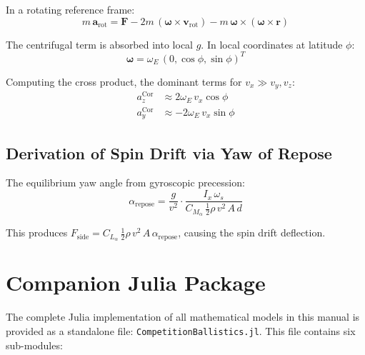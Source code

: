 \documentclass[11pt,twoside,openright]{report}
\newcommand{\vvec}{\bm{v}}
\newcommand{\avec}{\bm{a}}
\newcommand{\rvec}{\bm{r}}
\begin{document}
In a rotating reference frame:
\begin{equation}
  m\,\avec_{\mathrm{rot}} = \bm{F} - 2m\,(\bm{\omega}\times\vvec_{\mathrm{rot}}) - m\,\bm{\omega}\times(\bm{\omega}\times\rvec)
\end{equation}

The centrifugal term is absorbed into local $g$. In local coordinates at latitude $\phi$:
\begin{equation}
  \bm{\omega} = \omega_E\,(0, \cos\phi, \sin\phi)^T
\end{equation}

Computing the cross product, the dominant terms for $v_x \gg v_y, v_z$:
\begin{align}
  a_z^{\mathrm{Cor}} &\approx 2\omega_E\,v_x\cos\phi \\
  a_y^{\mathrm{Cor}} &\approx -2\omega_E\,v_x\sin\phi
\end{align}

\section{Derivation of Spin Drift via Yaw of Repose}

The equilibrium yaw angle from gyroscopic precession:
\begin{equation}
  \alpha_{\mathrm{repose}} = \frac{g}{v^2}\cdot\frac{I_x\,\omega_s}{C_{M_\alpha}\,\frac{1}{2}\rho\,v^2\,A\,d}
\end{equation}

This produces $F_{\mathrm{side}} = C_{L_\alpha}\,\frac{1}{2}\rho\,v^2\,A\,\alpha_{\mathrm{repose}}$, causing the spin drift deflection.


\chapter{Companion Julia Package}
\label{app:julia_file}

The complete Julia implementation of all mathematical models in this manual is provided as a standalone file: \texttt{CompetitionBallistics.jl}. This file contains six sub-modules:
\end{document}
